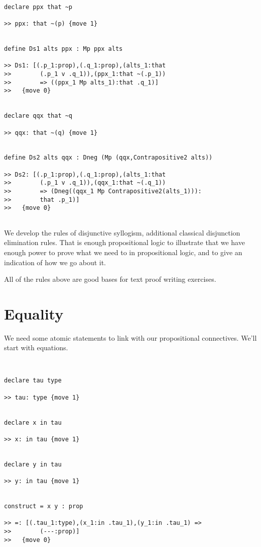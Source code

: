 \documentclass[12pt]{article}
\begin{document}
\begin{verbatim}

declare ppx that ~p

>> ppx: that ~(p) {move 1}


define Ds1 alts ppx : Mp ppx alts

>> Ds1: [(.p_1:prop),(.q_1:prop),(alts_1:that 
>>        (.p_1 v .q_1)),(ppx_1:that ~(.p_1)) 
>>        => ((ppx_1 Mp alts_1):that .q_1)]
>>   {move 0}


declare qqx that ~q

>> qqx: that ~(q) {move 1}


define Ds2 alts qqx : Dneg (Mp (qqx,Contrapositive2 alts))

>> Ds2: [(.p_1:prop),(.q_1:prop),(alts_1:that 
>>        (.p_1 v .q_1)),(qqx_1:that ~(.q_1)) 
>>        => (Dneg((qqx_1 Mp Contrapositive2(alts_1))):
>>        that .p_1)]
>>   {move 0}


\end{verbatim}

We develop the rules of disjunctive syllogism, additional classical disjunction elimination rules.   That is enough propositional logic to illustrate that we have enough power to prove what we need to in propositional logic, and to give an indication of how we go about it.

All of the rules above are good bases for text proof writing exercises.

\newpage

\section{Equality}

We need some atomic statements to link with our propositional connectives.  We'll start with equations.

\begin{verbatim}


declare tau type

>> tau: type {move 1}


declare x in tau

>> x: in tau {move 1}


declare y in tau

>> y: in tau {move 1}


construct = x y : prop

>> =: [(.tau_1:type),(x_1:in .tau_1),(y_1:in .tau_1) => 
>>        (---:prop)]
>>   {move 0}

\end{verbatim}
\end{document}
